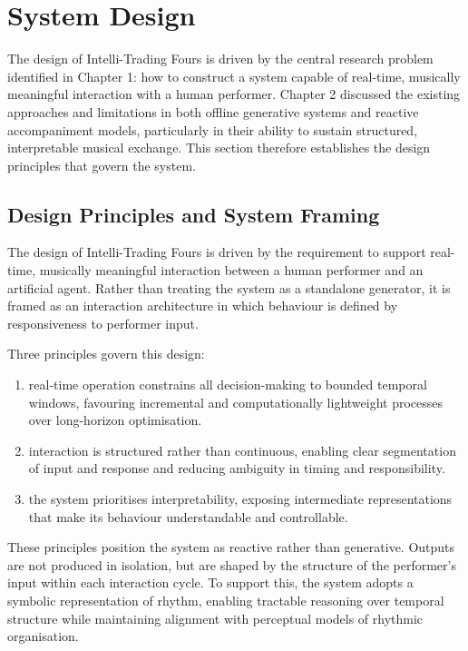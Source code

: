 \chapter{System Design}\label{system-design}

The design of Intelli-Trading Fours is driven by the central research
problem identified in Chapter 1: how to construct a system capable of
real-time, musically meaningful interaction with a human performer.
Chapter 2 discussed the existing approaches and limitations in both
offline generative systems and reactive accompaniment models,
particularly in their ability to sustain structured, interpretable
musical exchange. This section therefore establishes the design
principles that govern the system.

\section{Design Principles and System Framing}\label{design-principles-and-system-framing}

The design of Intelli-Trading Fours is driven by the requirement to
support real-time, musically meaningful interaction between a human
performer and an artificial agent. Rather than treating the system as a
standalone generator, it is framed as an interaction architecture in
which behaviour is defined by responsiveness to performer input.

Three principles govern this design:

\begin{enumerate}
\def\labelenumi{\arabic{enumi}.}
\item
  real-time operation constrains all decision-making to bounded temporal
  windows, favouring incremental and computationally lightweight
  processes over long-horizon optimisation.
\item
  interaction is structured rather than continuous, enabling clear
  segmentation of input and response and reducing ambiguity in timing
  and responsibility.
\item
  the system prioritises interpretability, exposing intermediate
  representations that make its behaviour understandable and
  controllable.
\end{enumerate}

These principles position the system as reactive rather than generative.
Outputs are not produced in isolation, but are shaped by the structure
of the performer's input within each interaction cycle. To support this,
the system adopts a symbolic representation of rhythm, enabling
tractable reasoning over temporal structure while maintaining alignment
with perceptual models of rhythmic organisation.

